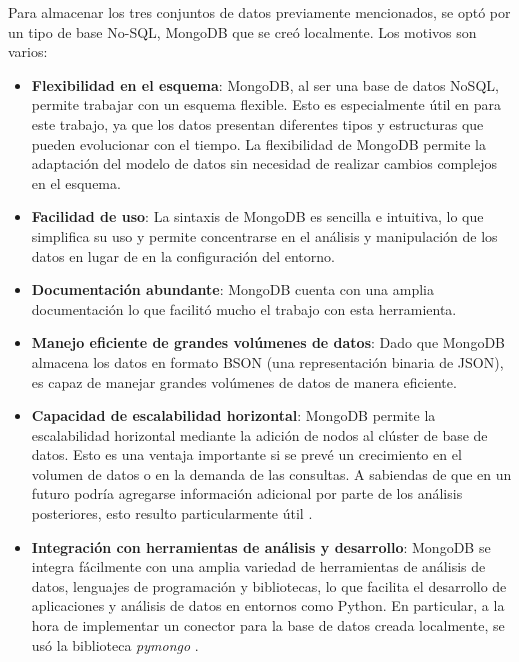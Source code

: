 \documentclass[11pt,a4paper,twoside,openany]{tesis}
\begin{document}
Para almacenar los tres conjuntos de datos previamente mencionados, se optó por un tipo de base No-SQL, MongoDB que se creó localmente. Los motivos son varios:
\begin{itemize}
    \item \textbf{Flexibilidad en el esquema}: MongoDB, al ser una base de datos NoSQL, permite trabajar con un esquema flexible. Esto es especialmente útil en para este trabajo, ya que los datos presentan diferentes tipos y estructuras que pueden evolucionar con el tiempo. La flexibilidad de MongoDB permite la adaptación del modelo de datos sin necesidad de realizar cambios complejos en el esquema.
    
    \item \textbf{Facilidad de uso}: La sintaxis de MongoDB es sencilla e intuitiva, lo que simplifica su uso y permite concentrarse en el análisis y manipulación de los datos en lugar de en la configuración del entorno.
    
    \item \textbf{Documentación abundante}: MongoDB cuenta con una amplia documentación lo que facilitó mucho el trabajo con esta herramienta. 
    
    \item \textbf{Manejo eficiente de grandes volúmenes de datos}: Dado que MongoDB almacena los datos en formato BSON (una representación binaria de JSON), es capaz de manejar grandes volúmenes de datos de manera eficiente.
    
    \item \textbf{Capacidad de escalabilidad horizontal}: MongoDB permite la escalabilidad horizontal mediante la adición de nodos al clúster de base de datos. Esto es una ventaja importante si se prevé un crecimiento en el volumen de datos o en la demanda de las consultas. A sabiendas de que en un futuro podría agregarse información adicional por parte de los análisis posteriores, esto resulto particularmente útil \cite{MongoDB-docs}.
    
    \item \textbf{Integración con herramientas de análisis y desarrollo}: MongoDB se integra fácilmente con una amplia variedad de herramientas de análisis de datos, lenguajes de programación y bibliotecas, lo que facilita el desarrollo de aplicaciones y análisis de datos en entornos como Python. En particular, a la hora de implementar un conector para la base de datos creada localmente, se usó la biblioteca \emph{pymongo} \cite{pymongo}.
\end{itemize}
\end{document}
